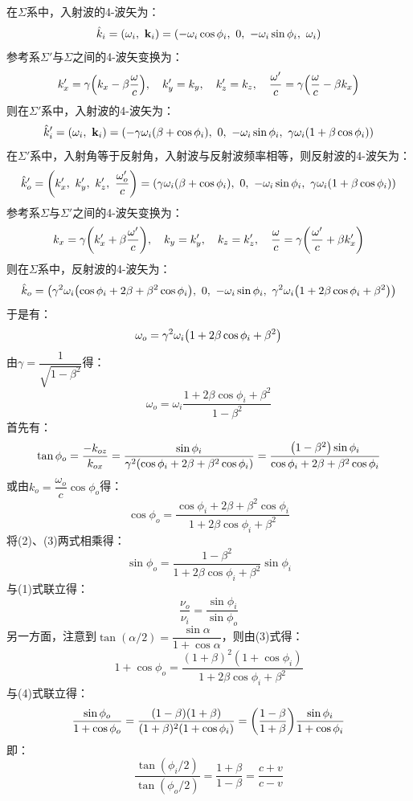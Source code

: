 \documentclass[a4paper]{article}
\begin{document}
\begin{enumerate}
    在$\varSigma$系中，入射波的4-波矢为：
    \[
    \hat{k}_i = (\omega_i,\ \mathbf{k}_i) = \qty(-\omega_i\cos\phi_i,\ 0,\ -\omega_i\sin\phi_i,\ \omega_i)
    \]
    参考系$\varSigma'$与$\varSigma$之间的4-波矢变换为：
    \[
    k'_x = \gamma\qty(k_x-\beta\frac{\omega}{c}),\quad k'_y = k_y,\quad k'_z = k_z,\quad \frac{\omega'}{c} = \gamma\qty(\frac{\omega}{c}-\beta k_x)
    \]
    则在$\varSigma'$系中，入射波的4-波矢为：
    \[
    \hat{k}'_i = (\omega_i,\ \mathbf{k}_i) = \qty(-\gamma\omega_i (\beta+\cos\phi_i),\ 0,\ -\omega_i\sin\phi_i,\ \gamma\omega_i (1+\beta\cos\phi_i))
    \]
    在$\varSigma'$系中，入射角等于反射角，入射波与反射波频率相等，则反射波的4-波矢为：
    \[
    \hat{k}'_o = \qty(k'_x,\ k'_y,\ k'_z,\ \frac{\omega'_o}{c}) = \qty(\gamma\omega_i (\beta+\cos\phi_i),\ 0,\ -\omega_i\sin\phi_i,\ \gamma\omega_i (1+\beta\cos\phi_i))
    \]
    参考系$\varSigma$与$\varSigma'$之间的4-波矢变换为：
    \[
    k_x = \gamma\qty(k_x' + \beta\frac{\omega'}{c}),\quad k_y = k_y',\quad k_z = k_z',\quad \frac{\omega}{c} = \gamma\qty(\frac{\omega'}{c} + \beta k'_x)
    \]
    则在$\varSigma$系中，反射波的4-波矢为：
    \[
    \hat{k}_o = \qty(\gamma^2\omega_i\qty(\cos\phi_i+2\beta+\beta^2\cos\phi_i),\ 0,\ -\omega_i\sin\phi_i,\ \gamma^2\omega_i\qty(1+2\beta\cos\phi_i+\beta^2))
    \]
    于是有：
    \[
    \omega_o = \gamma^2\omega_i\qty(1+2\beta\cos\phi_i+\beta^2)
    \]
    由$\gamma=\dfrac{1}{\sqrt{1-\beta^2}}$得：
    \begin{equation}
        \omega_o = \omega_i \frac{1 + 2\beta\cos\phi_i + \beta^2}{1-\beta^2}
    \end{equation}
    首先有：
    \begin{equation}
    \tan\phi_o = \frac{-k_{oz}}{k_{ox}} = \frac{\sin\phi_i}{\gamma^2\qty(\cos\phi_i+2\beta+\beta^2\cos\phi_i)} = \frac{\qty(1-\beta^2)\sin\phi_i}{\cos\phi_i + 2\beta + \beta^2\cos\phi_i}
    \end{equation}
    或由$k_o=\dfrac{\omega_o}{c}\cos\phi_o$得：
    \begin{equation}
    \cos\phi_o = \frac{\cos\phi_i + 2\beta + \beta^2\cos\phi_i}{1 + 2\beta\cos\phi_i + \beta^2}
    \end{equation}
    将(2)、(3)两式相乘得：
    \begin{equation}
        \sin\phi_o = \frac{1 - \beta^2}{1 + 2\beta\cos\phi_i + \beta^2} \sin\phi_i
    \end{equation}
    与(1)式联立得：
    \[
        \frac{\nu_o}{\nu_i} = \frac{\sin\phi_i}{\sin\phi_o}
    \]
    另一方面，注意到$\tan(\alpha/2) = \dfrac{\sin\alpha}{1 + \cos\alpha}$，则由(3)式得：
    \[
        1 + \cos\phi_o = \frac{(1+\beta)^2 (1+\cos\phi_i)}{1 + 2\beta\cos\phi_i + \beta^2}
    \]
    与(4)式联立得：
    \[
        \frac{\sin\phi_o}{1 + \cos\phi_o} = \frac{(1 - \beta) (1 + \beta)}{(1+\beta)^2 (1+\cos\phi_i)} = \qty(\frac{1 - \beta}{1 + \beta}) \frac{\sin\phi_i}{1 + \cos\phi_i}
    \]
    即：
    \[
        \frac{\tan(\phi_i/2)}{\tan(\phi_o/2)} = \frac{1 + \beta}{1 - \beta} = \frac{c + v}{c - v}
    \]
\end{enumerate}
\end{document}
